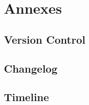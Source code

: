 \documentclass[12pt,a4paper]{article}
\begin{document}
\section{Annexes}
\subsection{Version Control}
\subsection{Changelog}
\subsection{Timeline}
\end{document}
